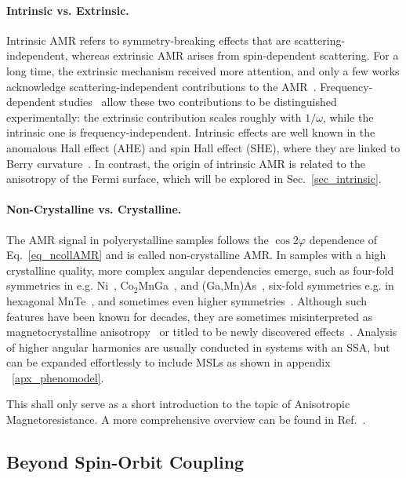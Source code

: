 \documentclass[prb,showpacs,amsmath,amssymb,superscriptaddress,twocolumn,floatfix]{revtex4-1}
\begin{document}
\paragraph{Intrinsic vs. Extrinsic.} Intrinsic AMR refers to symmetry-breaking effects that are scattering-independent, whereas extrinsic AMR arises from spin-dependent scattering. For a long time, the extrinsic mechanism received more attention, and only a few works acknowledge scattering-independent contributions to the AMR~\cite{Kato:2008, Velev:2005, Zeng:2020, Kato:2007, Nadvordnik:2021, Park:2021}. Frequency-dependent studies~\cite{Nadvordnik:2021, Park:2021} allow these two contributions to be distinguished experimentally: the extrinsic contribution scales roughly with $1/\omega$, while the intrinsic one is frequency-independent. Intrinsic effects are well known in the anomalous Hall effect (AHE) and spin Hall effect (SHE), where they are linked to Berry curvature~\cite{Nagaosa:2010, Zhang:2017}. In contrast, the origin of intrinsic AMR is related to the anisotropy of the Fermi surface, which will be explored in Sec.~\ref{sec_intrinsic}.

\paragraph{Non-Crystalline vs. Crystalline.} The AMR signal in polycrystalline samples follows the $\cos 2\varphi$ dependence of Eq.~\ref{eq_ncollAMR} and is called non-crystalline AMR. In samples with a high crystalline quality, more complex angular dependencies emerge, such as four-fold symmetries in e.g. Ni~\cite{Doring:1938}, Co$_2$MnGa~\cite{Sato:2019,Ritzinger:2021}, and (Ga,Mn)As~\cite{DeRanieri:2008}, six-fold symmetries e.g. in hexagonal MnTe~\cite{Kriegner:2017, Gonzalez-Betancourt:2024}, and sometimes even higher symmetries~\cite{Gonzalez-Betancourt:2024, NamHai:2012}. Although such features have been known for decades, they are sometimes misinterpreted as magnetocrystalline anisotropy~\cite{Ritzinger:2023} or titled to be newly discovered effects~\cite{Dong:2023}. Analysis of higher angular harmonics are usually conducted in systems with an SSA, but can be expanded effortlessly to include MSLs as shown in appendix ~\ref{apx_phenomodel}.

This shall only serve as a short introduction to the topic of Anisotropic Magnetoresistance. A more comprehensive overview can be found in Ref.~\cite{Ritzinger:2023}.

\subsection{Beyond Spin-Orbit Coupling}
\end{document}
